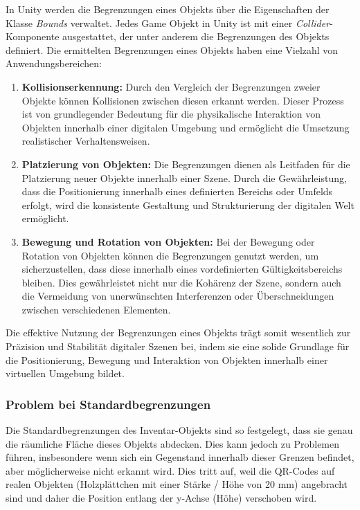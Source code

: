 In Unity werden die Begrenzungen eines Objekts über die Eigenschaften der Klasse \textit{Bounds} verwaltet. Jedes Game
Objekt in Unity ist mit einer \textit{Collider}-Komponente ausgestattet, der unter anderem die Begrenzungen des Objekts
definiert. Die ermittelten Begrenzungen eines Objekts haben eine Vielzahl von Anwendungsbereichen:

\begin{enumerate}
    \item \textbf{Kollisionserkennung:} Durch den Vergleich der Begrenzungen zweier Objekte können Kollisionen zwischen
    diesen erkannt werden. Dieser Prozess ist von grundlegender Bedeutung für die physikalische Interaktion von Objekten
    innerhalb einer digitalen Umgebung und ermöglicht die Umsetzung realistischer Verhaltensweisen.

    \item \textbf{Platzierung von Objekten:} Die Begrenzungen dienen als Leitfaden für die Platzierung neuer Objekte
    innerhalb einer Szene. Durch die Gewährleistung, dass die Positionierung innerhalb eines definierten Bereichs oder
    Umfelds erfolgt, wird die konsistente Gestaltung und Strukturierung der digitalen Welt ermöglicht.

    \item \textbf{Bewegung und Rotation von Objekten:} Bei der Bewegung oder Rotation von Objekten können die Begrenzungen
    genutzt werden, um sicherzustellen, dass diese innerhalb eines vordefinierten Gültigkeitsbereichs bleiben. Dies
    gewährleistet nicht nur die Kohärenz der Szene, sondern auch die Vermeidung von unerwünschten Interferenzen oder
    Überschneidungen zwischen verschiedenen Elementen.
\end{enumerate}

Die effektive Nutzung der Begrenzungen eines Objekts trägt somit wesentlich zur Präzision und Stabilität digitaler
Szenen bei, indem sie eine solide Grundlage für die Positionierung, Bewegung und Interaktion von Objekten innerhalb
einer virtuellen Umgebung bildet.

\subsubsection{Problem bei Standardbegrenzungen}
Die Standardbegrenzungen des Inventar-Objekts sind so festgelegt, dass sie genau die räumliche Fläche dieses Objekts
abdecken. Dies kann jedoch zu Problemen führen, insbesondere wenn sich ein Gegenstand innerhalb dieser Grenzen befindet,
aber möglicherweise nicht erkannt wird. Dies tritt auf, weil die QR-Codes auf realen Objekten (Holzplättchen mit einer
Stärke / Höhe von 20 mm) angebracht sind und daher die Position entlang der y-Achse (Höhe) verschoben wird.

